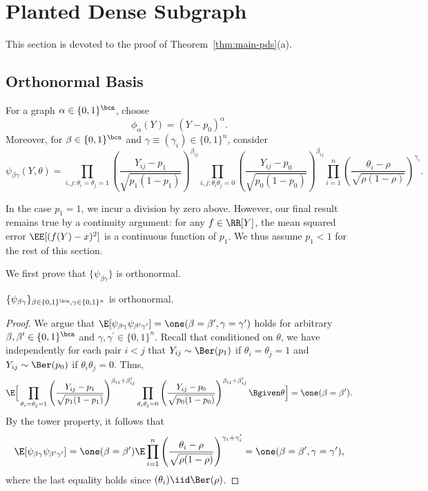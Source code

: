 \documentclass[11pt]{article}
\begin{document}
\section{Planted Dense Subgraph}
\label{sec:pds}

This section is devoted to the proof of Theorem~\ref{thm:main-pds}(a).

\subsection{Orthonormal Basis}

For a graph $\alpha\in \{0,1\}^{\bcn}$, choose
\begin{equation*}
    \phi_{\alpha}(Y)=(Y-p_0)^{\alpha}.
\end{equation*}
Moreover, for $\beta \in \{0,1\}^{\bcn}$ and $\gamma\equiv (\gamma_i) \in\{0,1\}^n$, consider 
\begin{equation*}
    \psi_{\beta \gamma}(Y,\theta)=\prod_{i,j:\theta_i=\theta_j=1}\left(\frac{Y_{ij}-p_1}{\sqrt{p_1(1-p_1)}}\right)^{\beta_{ij}}\prod_{i,j:\theta_i \theta_j=0}\left(\frac{Y_{ij}-p_0}{\sqrt{p_0(1-p_0)}}\right)^{\beta_{ij}}\prod_{i=1}^{n}\left(\frac{\theta_i-\rho}{\sqrt{\rho(1-\rho)}}\right)^{\gamma_i}.
\end{equation*}
\begin{remark}[$p_1=1$]
In the case $p_1=1$, we incur a division by zero above. However, our final result remains true by a continuity argument: for any $f \in \RR[Y]$, the mean squared error $\EE[(f(Y)-x)^2]$ is a continuous function of $p_1$. We thus assume $p_1<1$ for the rest of this section.
\end{remark}
We first prove that $\{\psi_{\beta\gamma}\}$ is orthonormal.
\begin{lemma}
    $\{\psi_{\beta\gamma}\}_{\beta\in\{0,1\}^{\bcn},\gamma\in \{0,1\}^n}$ is orthonormal.
\end{lemma}
\begin{proof}
We argue that $\E[\psi_{\beta\gamma}\psi_{\beta^\prime\gamma^\prime}]=\one(\beta=\beta^\prime, \gamma=\gamma^\prime)$ holds for arbitrary $\beta,\beta^\prime \in \{0,1\}^{\bcn}$ and $\gamma,\gamma^\prime\in \{0,1\}^{n}$. Recall that conditioned on $\theta$, we have independently for each pair $i<j$ that $Y_{ij}\sim \Ber (p_1)$ if $\theta_i=\theta_j=1$ and $Y_{ij}\sim \Ber(p_0)$ if $\theta_i \theta_j=0$. Thus,
\begin{equation*}
\E\Big[\prod_{\theta_i=\theta_j=1}\left(\frac{Y_{ij}-p_1}{\sqrt{p_1(1-p_1)}}\right)^{\beta_{ij}+\beta^\prime_{ij}}\prod_{\theta_i \theta_j=0}\left(\frac{Y_{ij}-p_0}{\sqrt{p_0(1-p_0)}}\right)^{\beta_{ij}+\beta^\prime_{ij}}\Bgiven \theta\Big]=\one(\beta=\beta^\prime). 
\end{equation*}
By the tower property, it follows that
\begin{equation*}
\E[\psi_{\beta\gamma}\psi_{\beta^\prime\gamma^\prime}]=\one(\beta=\beta^\prime)\E\prod_{i=1}^{n}\left(\frac{\theta_i-\rho}{\sqrt{\rho(1-\rho)}}\right)^{\gamma_i+\gamma^\prime_i}=\one(\beta=\beta^\prime,\gamma=\gamma^\prime),
\end{equation*}
where the last equality holds since $(\theta_i)\iid \Ber(\rho)$.
\end{proof}
\end{document}

